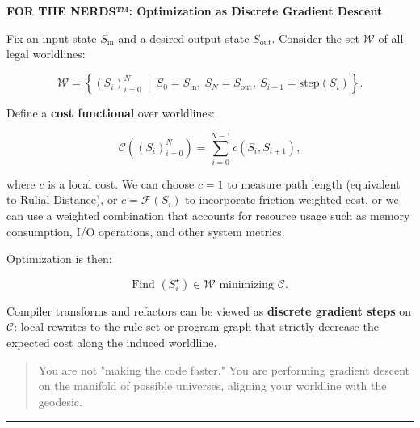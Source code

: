 \begin{mdframed}[linewidth=1pt, linecolor=black!50, innertopmargin=8pt, innerbottommargin=8pt]
\noindent\textbf{FOR THE NERDS™: Optimization as Discrete Gradient Descent}

\medskip

Fix an input state $S_{\mathrm{in}}$ and a desired output state $S_{\mathrm{out}}$.
Consider the set $\mathcal{W}$ of all legal worldlines:

\[
\mathcal{W} =
\left\{
(S_i)_{i=0}^N \ \middle|\
S_0 = S_{\mathrm{in}},\ S_N = S_{\mathrm{out}},\ S_{i+1} = \mathrm{step}(S_i)
\right\}.
\]

Define a \textbf{cost functional} over worldlines:

\[
\mathcal{C}((S_i)_{i=0}^N)
= \sum_{i=0}^{N-1} c(S_i, S_{i+1}),
\]

where $c$ is a local cost. We can choose $c = 1$ to measure path length (equivalent to Rulial Distance), or $c = \mathcal{F}(S_i)$ to incorporate friction-weighted cost, or we can use a weighted combination that accounts for resource usage such as memory consumption, I/O operations, and other system metrics.

Optimization is then:

\[
\text{Find } (S_i^\star) \in \mathcal{W} \text{ minimizing } \mathcal{C}.
\]

Compiler transforms and refactors can be viewed as \textbf{discrete gradient steps}
on $\mathcal{C}$: local rewrites to the rule set or program graph that strictly
decrease the expected cost along the induced worldline.

\begin{quote}
You are not "making the code faster." You are performing gradient descent
on the manifold of possible universes, aligning your worldline with the geodesic.
\end{quote}

\end{mdframed}

\begin{center}
\rule{0.5\linewidth}{0.5pt}
\end{center}

